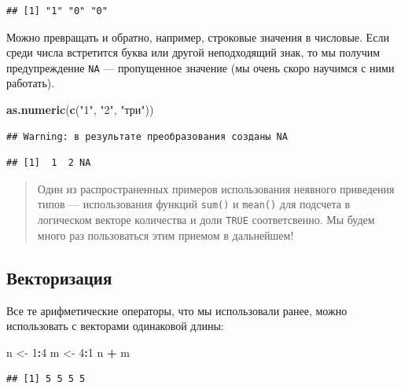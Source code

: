 \documentclass[]{book}
\newenvironment{Shaded}{\begin{snugshade}}{\end{snugshade}}
\newcommand{\KeywordTok}[1]{\textcolor[rgb]{0.13,0.29,0.53}{\textbf{#1}}}
\newcommand{\DecValTok}[1]{\textcolor[rgb]{0.00,0.00,0.81}{#1}}
\newcommand{\StringTok}[1]{\textcolor[rgb]{0.31,0.60,0.02}{#1}}
\newcommand{\OperatorTok}[1]{\textcolor[rgb]{0.81,0.36,0.00}{\textbf{#1}}}
\newcommand{\NormalTok}[1]{#1}
\begin{document}
\begin{verbatim}
## [1] "1" "0" "0"
\end{verbatim}

Можно превращать и обратно, например, строковые значения в числовые.
Если среди числа встретится буква или другой неподходящий знак, то мы
получим предупреждение \texttt{NA} --- пропущенное значение (мы очень
скоро научимся с ними работать).

\begin{Shaded}
\begin{Highlighting}[]
\KeywordTok{as.numeric}\NormalTok{(}\KeywordTok{c}\NormalTok{(}\StringTok{"1"}\NormalTok{, }\StringTok{"2"}\NormalTok{, }\StringTok{"три"}\NormalTok{))}
\end{Highlighting}
\end{Shaded}

\begin{verbatim}
## Warning: в результате преобразования созданы NA
\end{verbatim}

\begin{verbatim}
## [1]  1  2 NA
\end{verbatim}

\begin{quote}
Один из распространенных примеров использования неявного приведения
типов --- использования функций \texttt{sum()} и \texttt{mean()} для
подсчета в логическом векторе количества и доли \texttt{TRUE}
соответсвенно. Мы будем много раз пользоваться этим приемом в
дальнейшем!
\end{quote}

\subsection{Векторизация}\label{vector_op}

Все те арифметические операторы, что мы использовали ранее, можно
использовать с векторами одинаковой длины:

\begin{Shaded}
\begin{Highlighting}[]
\NormalTok{n <-}\StringTok{ }\DecValTok{1}\OperatorTok{:}\DecValTok{4}
\NormalTok{m <-}\StringTok{ }\DecValTok{4}\OperatorTok{:}\DecValTok{1}
\NormalTok{n }\OperatorTok{+}\StringTok{ }\NormalTok{m}
\end{Highlighting}
\end{Shaded}

\begin{verbatim}
## [1] 5 5 5 5
\end{verbatim}
\end{document}
